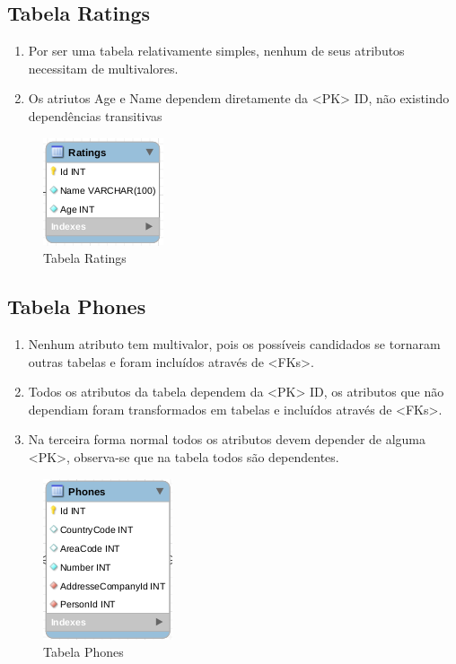 \documentclass[a4paper,10pt]{article}
\begin{document}

\subsection{Tabela Ratings}

\begin{enumerate}
	\item Por ser uma tabela relativamente simples, nenhum de seus atributos necessitam de multivalores.
	\item Os atriutos Age e Name dependem diretamente da <PK> ID, não existindo dependências transitivas
\end{enumerate}	

\begin{figure}%
\includegraphics[width=.4\columnwidth]{normalizacao/ratings}%
\caption{Tabela Ratings}%
\end{figure}

\subsection{Tabela Phones}

\begin{enumerate}
	\item Nenhum atributo tem multivalor, pois os possíveis candidados se tornaram outras tabelas e foram incluídos através de <FKs>.
	\item Todos os atributos da tabela dependem da <PK> ID, os atributos que não dependiam foram transformados em tabelas e incluídos através de <FKs>.
	\item Na terceira forma normal todos os atributos devem depender de alguma <PK>, observa-se que na tabela todos são dependentes.
\end{enumerate}			

\begin{figure}%
\includegraphics[width=.4\columnwidth]{normalizacao/phones}%
\caption{Tabela Phones}%
\end{figure}
\end{document}
